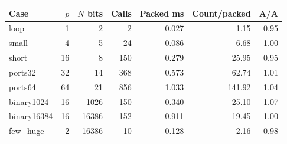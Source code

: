 \begin{tabular}{@{}lrrrrrr@{}}
\toprule
Case & $p$ & $N$ bits & Calls & Packed ms & Count/packed & A/A \\
\midrule
loop & 1 & 2 & 2 & 0.027 & 1.15 & 0.95 \\
small & 4 & 5 & 24 & 0.086 & 6.68 & 1.00 \\
short & 16 & 8 & 150 & 0.279 & 25.95 & 0.95 \\
ports32 & 32 & 14 & 368 & 0.573 & 62.74 & 1.01 \\
ports64 & 64 & 21 & 856 & 1.033 & 141.92 & 1.04 \\
binary1024 & 16 & 1026 & 150 & 0.340 & 25.10 & 1.07 \\
binary16384 & 16 & 16386 & 152 & 0.911 & 19.45 & 1.00 \\
few\_huge & 2 & 16386 & 10 & 0.128 & 2.16 & 0.98 \\
\bottomrule
\end{tabular}
